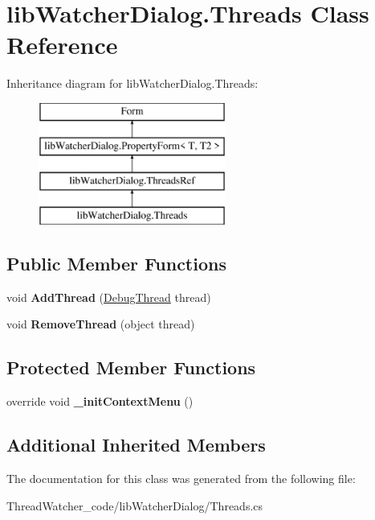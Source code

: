 \hypertarget{classlib_watcher_dialog_1_1_threads}{\section{lib\+Watcher\+Dialog.\+Threads Class Reference}
\label{classlib_watcher_dialog_1_1_threads}
}
Inheritance diagram for lib\+Watcher\+Dialog.\+Threads\+:\begin{figure}[H]
\begin{center}
\leavevmode
\includegraphics[height=4.000000cm]{classlib_watcher_dialog_1_1_threads}
\end{center}
\end{figure}
\subsection*{Public Member Functions}
\begin{DoxyCompactItemize}
\item 
\hypertarget{classlib_watcher_dialog_1_1_threads_a11e1f5fcf9f041bb500b37ea388ac200}{void {\bfseries Add\+Thread} (\hyperlink{classlib_wather_debugger_1_1_thread_1_1_debug_thread}{Debug\+Thread} thread)}\label{classlib_watcher_dialog_1_1_threads_a11e1f5fcf9f041bb500b37ea388ac200}

\item 
\hypertarget{classlib_watcher_dialog_1_1_threads_a137f7200354304d58c84af9abf5bfb5a}{void {\bfseries Remove\+Thread} (object thread)}\label{classlib_watcher_dialog_1_1_threads_a137f7200354304d58c84af9abf5bfb5a}

\end{DoxyCompactItemize}
\subsection*{Protected Member Functions}
\begin{DoxyCompactItemize}
\item 
\hypertarget{classlib_watcher_dialog_1_1_threads_ad8375ed2018902f64072c4a1e71715d1}{override void {\bfseries \+\_\+init\+Context\+Menu} ()}\label{classlib_watcher_dialog_1_1_threads_ad8375ed2018902f64072c4a1e71715d1}

\end{DoxyCompactItemize}
\subsection*{Additional Inherited Members}


The documentation for this class was generated from the following file\+:\begin{DoxyCompactItemize}
\item 
Thread\+Watcher\+\_\+code/lib\+Watcher\+Dialog/Threads.\+cs\end{DoxyCompactItemize}
